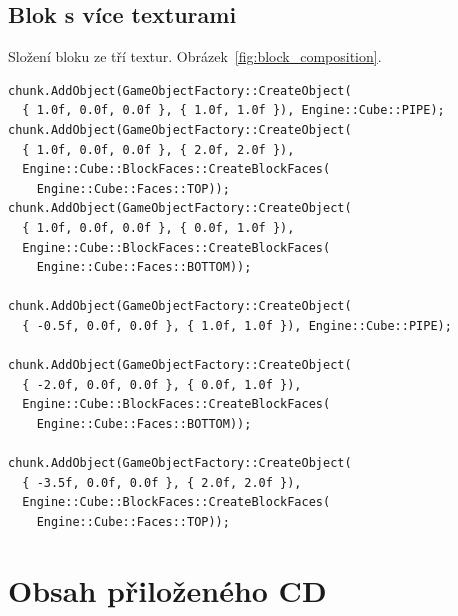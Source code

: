 \documentclass[thesis=M,czech]{FITthesis}[2019/12/23]
\begin{document}
\section{Blok s více texturami}

Složení bloku ze tří textur. Obrázek~\ref{fig:block_composition}.

\begin{verbatim}
chunk.AddObject(GameObjectFactory::CreateObject(
  { 1.0f, 0.0f, 0.0f }, { 1.0f, 1.0f }), Engine::Cube::PIPE);
chunk.AddObject(GameObjectFactory::CreateObject(
  { 1.0f, 0.0f, 0.0f }, { 2.0f, 2.0f }),
  Engine::Cube::BlockFaces::CreateBlockFaces(
    Engine::Cube::Faces::TOP));
chunk.AddObject(GameObjectFactory::CreateObject(
  { 1.0f, 0.0f, 0.0f }, { 0.0f, 1.0f }),
  Engine::Cube::BlockFaces::CreateBlockFaces(
    Engine::Cube::Faces::BOTTOM));

chunk.AddObject(GameObjectFactory::CreateObject(
  { -0.5f, 0.0f, 0.0f }, { 1.0f, 1.0f }), Engine::Cube::PIPE);

chunk.AddObject(GameObjectFactory::CreateObject(
  { -2.0f, 0.0f, 0.0f }, { 0.0f, 1.0f }),
  Engine::Cube::BlockFaces::CreateBlockFaces(
    Engine::Cube::Faces::BOTTOM));

chunk.AddObject(GameObjectFactory::CreateObject(
  { -3.5f, 0.0f, 0.0f }, { 2.0f, 2.0f }),
  Engine::Cube::BlockFaces::CreateBlockFaces(
    Engine::Cube::Faces::TOP));
\end{verbatim}

\chapter{Obsah přiloženého CD}


\begin{figure}
\end{figure}
\end{document}
